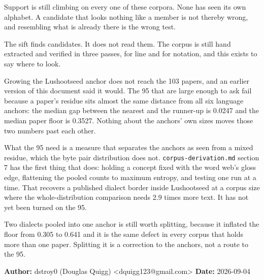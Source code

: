 Support is still climbing on every one of these corpora. None has seen its own alphabet. A candidate that looks nothing like a member is not thereby wrong, and resembling what is already there is the wrong test.

The sift finds candidates. It does not read them. The corpus is still hand extracted and verified in three passes, for line and for notation, and this exists to say where to look.

Growing the Lushootseed anchor does not reach the 103 papers, and an earlier version of this document said it would. The 95 that are large enough to ask fail because a paper's residue sits almost the same distance from all six language anchors: the median gap between the nearest and the runner-up is 0.0247 and the median paper floor is 0.3527. Nothing about the anchors' own sizes moves those two numbers past each other.

What the 95 need is a measure that separates the anchors as seen from a mixed residue, which the byte pair distribution does not. \texttt{corpus-\allowbreak{}derivation.\allowbreak{}md} section 7 has the first thing that does: holding a concept fixed with the word web's gloss edge, flattening the pooled counts to maximum entropy, and testing one run at a time. That recovers a published dialect border inside Lushootseed at a corpus size where the whole-distribution comparison needs 2.9 times more text. It has not yet been turned on the 95.

Two dialects pooled into one anchor is still worth splitting, because it inflated the floor from 0.305 to 0.641 and it is the same defect in every corpus that holds more than one paper. Splitting it is a correction to the anchors, not a route to the 95.

\textbf{Author:} dstroy0 (Douglas Quigg) <dquigg123@gmail.com> \textbf{Date:} 2026-09-04

